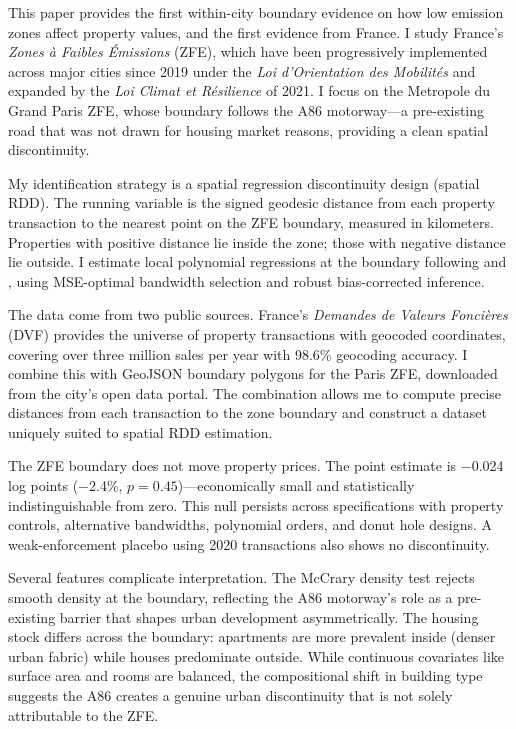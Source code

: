\documentclass[12pt]{article}
\begin{document}
This paper provides the first within-city boundary evidence on how low emission zones affect property values, and the first evidence from France. I study France's \textit{Zones \`a Faibles \'Emissions} (ZFE), which have been progressively implemented across major cities since 2019 under the \textit{Loi d'Orientation des Mobilit\'es} and expanded by the \textit{Loi Climat et R\'esilience} of 2021. I focus on the Metropole du Grand Paris ZFE, whose boundary follows the A86 motorway---a pre-existing road that was not drawn for housing market reasons, providing a clean spatial discontinuity.

My identification strategy is a spatial regression discontinuity design (spatial RDD). The running variable is the signed geodesic distance from each property transaction to the nearest point on the ZFE boundary, measured in kilometers. Properties with positive distance lie inside the zone; those with negative distance lie outside. I estimate local polynomial regressions at the boundary following \citet{calonico2014robust} and \citet{cattaneo2020practical}, using MSE-optimal bandwidth selection and robust bias-corrected inference.

The data come from two public sources. France's \textit{Demandes de Valeurs Fonci\`eres} (DVF) provides the universe of property transactions with geocoded coordinates, covering over three million sales per year with 98.6\% geocoding accuracy. I combine this with GeoJSON boundary polygons for the Paris ZFE, downloaded from the city's open data portal. The combination allows me to compute precise distances from each transaction to the zone boundary and construct a dataset uniquely suited to spatial RDD estimation.

The ZFE boundary does not move property prices. The point estimate is $-$0.024 log points ($-$2.4\%, $p = 0.45$)---economically small and statistically indistinguishable from zero. This null persists across specifications with property controls, alternative bandwidths, polynomial orders, and donut hole designs. A weak-enforcement placebo using 2020 transactions also shows no discontinuity.

Several features complicate interpretation. The McCrary density test \citep{mccrary2008manipulation, cattaneo2020density} rejects smooth density at the boundary, reflecting the A86 motorway's role as a pre-existing barrier that shapes urban development asymmetrically. The housing stock differs across the boundary: apartments are more prevalent inside (denser urban fabric) while houses predominate outside. While continuous covariates like surface area and rooms are balanced, the compositional shift in building type suggests the A86 creates a genuine urban discontinuity that is not solely attributable to the ZFE.
\end{document}
